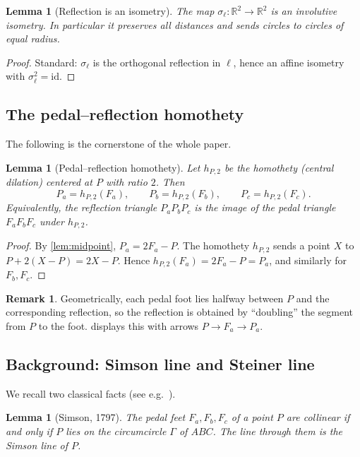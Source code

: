 \documentclass[11pt,a4paper]{article}
\newtheorem{lemma}[theorem]{Lemma}
\theoremstyle{definition}
\newtheorem{remark}[theorem]{Remark}
\newcommand{\R}{\mathbb{R}}
\newcommand{\Pa}{P_{a}}
\newcommand{\Pb}{P_{b}}
\newcommand{\Pc}{P_{c}}
\newcommand{\Fa}{F_{a}}
\newcommand{\Fb}{F_{b}}
\newcommand{\Fc}{F_{c}}
\newcommand{\circc}{\Gamma}
\begin{document}
\begin{lemma}[Reflection is an isometry]\label{lem:isometry}
The map $\sigma_{\ell}:\R^{2}\to\R^{2}$ is an involutive isometry. In particular it preserves all distances and sends circles to circles of equal radius.
\end{lemma}
\begin{proof}
Standard: $\sigma_{\ell}$ is the orthogonal reflection in $\ell$, hence an affine isometry with $\sigma_{\ell}^{2}=\mathrm{id}$.
\end{proof}

\subsection{The pedal--reflection homothety}

The following is the cornerstone of the whole paper.

\begin{lemma}[Pedal--reflection homothety]\label{lem:homothety}
Let $h_{P,2}$ be the homothety (central dilation) centered at $P$ with ratio $2$. Then
\begin{equation}\label{eq:homothety}
\Pa=h_{P,2}(\Fa),\qquad \Pb=h_{P,2}(\Fb),\qquad \Pc=h_{P,2}(\Fc).
\end{equation}
Equivalently, the reflection triangle $\Pa\Pb\Pc$ is the image of the pedal triangle $\Fa\Fb\Fc$ under $h_{P,2}$.
\end{lemma}
\begin{proof}
By \cref{lem:midpoint}, $\Pa=2\Fa-P$. The homothety $h_{P,2}$ sends a point $X$ to $P+2(X-P)=2X-P$. Hence $h_{P,2}(\Fa)=2\Fa-P=\Pa$, and similarly for $\Fb,\Fc$.
\end{proof}

\begin{remark}\label{rem:homothety-visual}
Geometrically, each pedal foot lies halfway between $P$ and the corresponding reflection, so the reflection is obtained by ``doubling'' the segment from $P$ to the foot.  displays this with arrows $P\to\Fa\to\Pa$.
\end{remark}

\subsection{Background: Simson line and Steiner line}

We recall two classical facts (see e.g.\ \cite{Coxeter,Johnson,Altshiller}).

\begin{lemma}[Simson, 1797]\label{lem:simson}
The pedal feet $\Fa,\Fb,\Fc$ of a point $P$ are collinear if and only if $P$ lies on the circumcircle $\circc$ of $ABC$. The line through them is the \emph{Simson line} of $P$.
\end{lemma}
\end{document}
